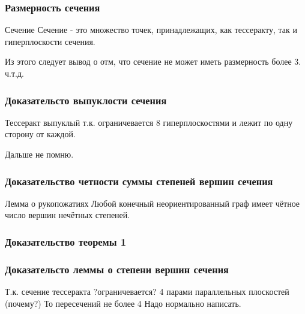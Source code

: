 \documentclass[10pt,pdf,hyperref={unicode}]{beamer}
\begin{document}
\begin{frame}
	\frametitle{Размерность сечения}
	\begin{block}{Сечение}
		Сечение - это множество точек, принадлежащих, как тессеракту, так и гиперплоскости сечения.
	\end{block}
	Из этого следует вывод о отм, что сечение не может иметь размерность более 3. \\
	ч.т.д.
\end{frame}
\begin{frame}
	\frametitle{Доказательсто выпуклости сечения}
	\begin{block}{Тессеракт выпуклый}
		т.к. ограничевается 8 гиперплоскостями и лежит по одну сторону от каждой.
	\end{block}
	Дальше не помню.	
\end{frame}
\begin{frame}
	\frametitle{Доказательство четности суммы степеней вершин сечения}
	\begin{block}{Лемма о рукопожатиях}
		Любой конечный неориентированный граф имеет чётное число вершин нечётных степеней.
	\end{block}
\end{frame}
\begin{frame}
	\frametitle{Доказательство теоремы 1}
\end{frame}
\begin{frame}
	\frametitle{Доказательсто леммы о степени вершин сечения}
	Т.к. сечение тессеракта ?ограничевается? 4 парами параллельных плоскостей (почему?)
	То пересечений не более 4
	Надо нормально написать.
	\begin{block}{}
	\end{block}
\end{frame}
\end{document}
